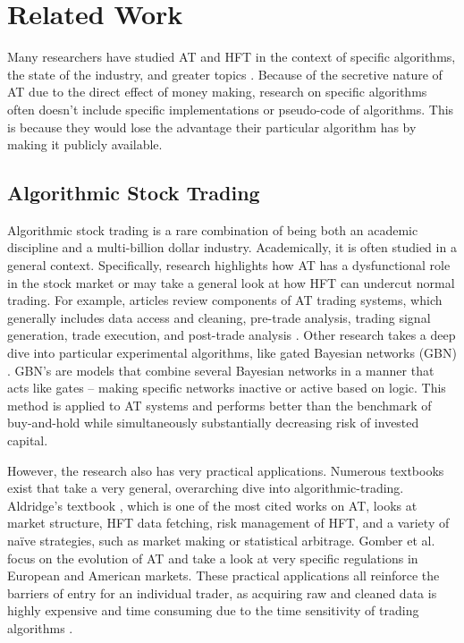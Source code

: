 \documentclass[../thesis.tex]{subfiles}
\begin{document}
\chapter{Related Work}
\label{ch:relatedwork}

Many researchers have studied AT and HFT in the context of specific algorithms, the state of the industry, and greater topics \cite{Treleaven2013}. Because of the secretive nature of AT due to the direct effect of money making, research on specific algorithms often doesn't include specific implementations or pseudo-code of algorithms. This is because they would lose the advantage their particular algorithm has by making it publicly available. 

\section{Algorithmic Stock Trading}

Algorithmic stock trading is a rare combination of being both an academic discipline and a multi-billion dollar industry. Academically, it is often studied in a general context. Specifically, research highlights how AT has a dysfunctional role in the stock market or may take a general look at how HFT can undercut normal trading.  For example, articles review components of AT trading systems, which generally includes data access and cleaning, pre-trade analysis, trading signal generation, trade execution, and post-trade analysis \cite{Treleaven2013}. Other research takes a deep dive into particular experimental algorithms, like gated Bayesian networks (GBN) \cite{Bendtsen2016}. GBN's are models that combine several Bayesian networks in a manner that acts like gates -- making specific networks inactive or active based on logic. This method is applied to AT systems and performs better than the benchmark of buy-and-hold while simultaneously substantially decreasing risk of invested capital. 

However, the research also has very practical applications. Numerous textbooks exist that take a very general, overarching dive into algorithmic-trading. Aldridge's textbook \cite{Aldridge2010}, which is one of the most cited works on AT, looks at market structure, HFT data fetching, risk management of HFT, and a variety of na\"{i}ve strategies, such as market making or statistical arbitrage. Gomber et al. \cite{Gomber2011} focus on the evolution of AT and take a look at very specific regulations in European and American markets. These practical applications all reinforce the barriers of entry for an individual trader, as acquiring raw and cleaned data is highly expensive and time consuming due to the time sensitivity of trading algorithms \cite{Treleaven2013}. 
\end{document}

